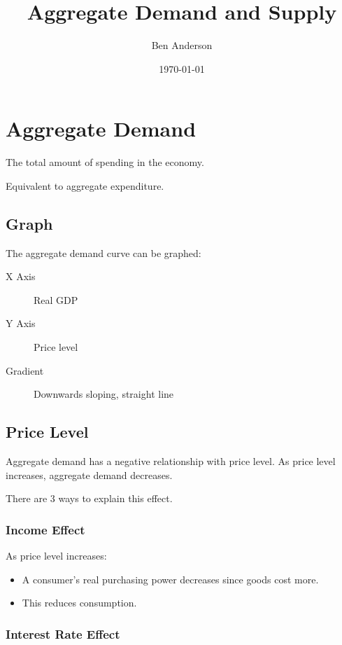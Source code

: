 \documentclass[a4paper,11pt]{article}
\begin{document}
\title{Aggregate Demand and Supply}
\author{Ben Anderson}
\date{\today}
\maketitle
\pagebreak

\tableofcontents
\pagebreak


\section{Aggregate Demand}

The total amount of spending in the economy.

Equivalent to aggregate expenditure.


\subsection{Graph}

The aggregate demand curve can be graphed:

\begin{description}
\item [X Axis] Real GDP
\item [Y Axis] Price level
\item [Gradient] Downwards sloping, straight line
\end{description}


\subsection{Price Level}

Aggregate demand has a negative relationship with price level. As price level
increases, aggregate demand decreases.

There are 3 ways to explain this effect.


\subsubsection{Income Effect}

As price level increases:

\begin{itemize}
\item A consumer's real purchasing power decreases since goods cost more.
\item This reduces consumption.
\end{itemize}


\subsubsection{Interest Rate Effect}
\end{document}
